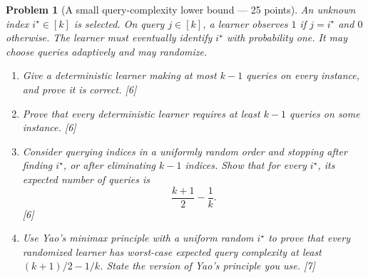 \documentclass[11pt]{article}
\theoremstyle{courseproblem}
\newtheorem{problem}{Problem}
\begin{document}
\begin{problem}[A small query-complexity lower bound --- 25 points]
An unknown index $i^\star\in[k]$ is selected. On query $j\in[k]$, a learner
observes $1$ if $j=i^\star$ and $0$ otherwise. The learner must eventually
identify $i^\star$ with probability one. It may choose queries adaptively and
may randomize.
\begin{enumerate}[label=(\alph*)]
  \item Give a deterministic learner making at most $k-1$ queries on every
  instance, and prove it is correct. \hfill [6]
  \item Prove that every deterministic learner requires at least $k-1$
  queries on some instance. \hfill [6]
  \item Consider querying indices in a uniformly random order and stopping
  after finding $i^\star$, or after eliminating $k-1$ indices. Show that for
  every $i^\star$, its expected number of queries is
  \[
  \frac{k+1}{2}-\frac1k.
  \]
  \hfill [6]
  \item Use Yao's minimax principle with a uniform random $i^\star$ to prove
  that every randomized learner has worst-case expected query complexity at
  least $(k+1)/2-1/k$. State the version of Yao's principle you use. \hfill [7]
\end{enumerate}
\end{problem}
\end{document}
